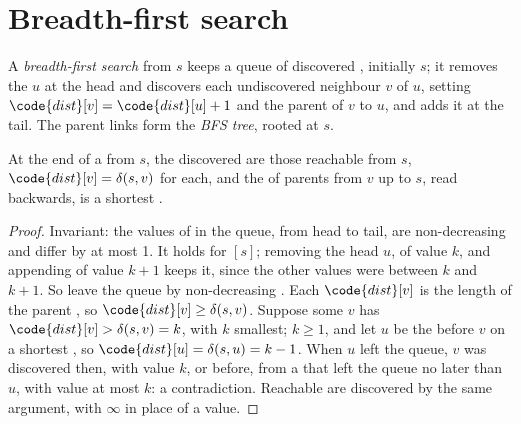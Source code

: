 \label{lst:b1:graph-traversals:dfs-iterative}

\section{Breadth-first search}\label{sec:b1:graph-traversals:bfs}

\begin{definition}\label{def:b1:graph-traversals:bfs}
A \emph{breadth-first search} from $s$ keeps a queue of discovered , initially $s$;
it removes the  $u$ at the head and discovers each undiscovered neighbour $v$ of $u$, setting $\code{dist}[v] =
\code{dist}[u] + 1$ and the parent of $v$ to $u$, and adds it at the tail. The parent links form the \emph{BFS
tree}, rooted at $s$.
\end{definition}

\label{lst:b1:graph-traversals:bfs}

\begin{theorem}\label{thm:b1:graph-traversals:bfs}
At the end of a  from $s$, the discovered  are those reachable from $s$, $\code{dist}[v] =
\delta(s, v)$ for each, and the  of parents from $v$ up to $s$, read backwards, is a shortest .
\end{theorem}

\begin{proof}
Invariant: the values of  in the queue, from head to tail, are non-decreasing and differ by at most 1. It
holds for $[s]$; removing the head $u$, of value $k$, and appending  of value $k + 1$ keeps it, since the other
values were between $k$ and $k + 1$. So  leave the queue by non-decreasing . Each $\code{dist}[v]$
is the length of the parent , so $\code{dist}[v] \geq \delta(s, v)$. Suppose some $v$ has $\code{dist}[v] >
\delta(s, v) = k$, with $k$ smallest; $k \geq 1$, and let $u$ be the  before $v$ on a shortest , so
$\code{dist}[u] = \delta(s, u) = k - 1$. When $u$ left the queue, $v$ was discovered then, with value $k$, or before,
from a  that left the queue no later than $u$, with value at most $k$: a contradiction. Reachable  are
discovered by the same argument, with $\infty$ in place of a value.
\end{proof}

